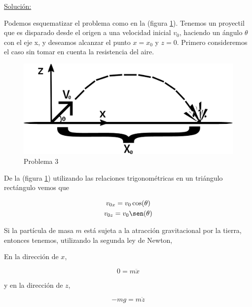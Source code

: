 \documentclass[a4paper,10pt]{article}
\begin{document}
\underline{Solución:}

\vspace{.3cm}

Podemos esquematizar el problema como en la (figura \ref{fig:problema3}). 
Tenemos un proyectil que es disparado desde el origen a una velocidad 
inicial $v_0$, haciendo un ángulo $\theta$ con el eje x, y deseamos
alcanzar el punto $x=x_0$ y $z=0$. Primero consideremos el caso sin
tomar en cuenta la resistencia del aire.

\begin{figure}[ht]
 \centering
\includegraphics[scale=0.3]{problema3fig1}
\caption{Problema 3}
\label{fig:problema3}
\end{figure}

\vspace{.3cm}

De la (figura \ref{fig:problema3}) utilizando las relaciones trigonométricas en un 
triángulo rectángulo vemos que

\begin{gather*}
v_{0x} = v_0\cos(\theta) \\
v_{0z} = v_0\sen(\theta)
\end{gather*}


Si la partícula de masa $m$ está sujeta a la atracción gravitacional
por la tierra, entonces tenemos, utilizando la segunda ley de Newton,

\vspace{.3cm}

En la dirección de $x$,

\begin{equation}
 0 = m \ddot{x}
 \label{ec:1}
\end{equation}

y en la dirección de $z$,

\begin{equation}
 - mg = m \ddot{z}
  \label{ec:2}
\end{equation}
\end{document}
